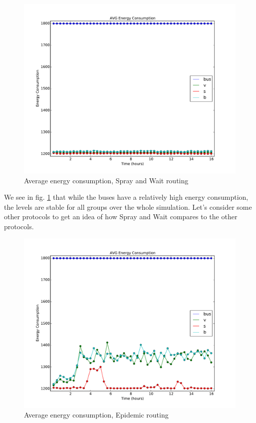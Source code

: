 \documentclass[conference]{IEEEtran}
\begin{document}
\begin{figure}
  \includegraphics[scale=0.25, center]{../one_1.5.1-RC2/plots/SprayAndWait_AVG_ENERGY_CONSUMPTION.pdf}
  \caption{Average energy consumption, Spray and Wait routing}
  \label{fig:avg_consumpt:snw}
\end{figure}
We see in fig. \ref{fig:avg_consumpt:snw} that while the buses have a relatively high energy consumption, the levels are stable for all groups over the whole simulation. Let's consider some other protocols to get an idea of how Spray and Wait compares to the other protocols.

\begin{figure}
  \includegraphics[scale=0.25, center]{../one_1.5.1-RC2/plots/Epidemic_AVG_ENERGY_CONSUMPTION.pdf}
  \caption{Average energy consumption, Epidemic routing}
  \label{fig:avg_consumpt:epidemic}
\end{figure}
\end{document}
